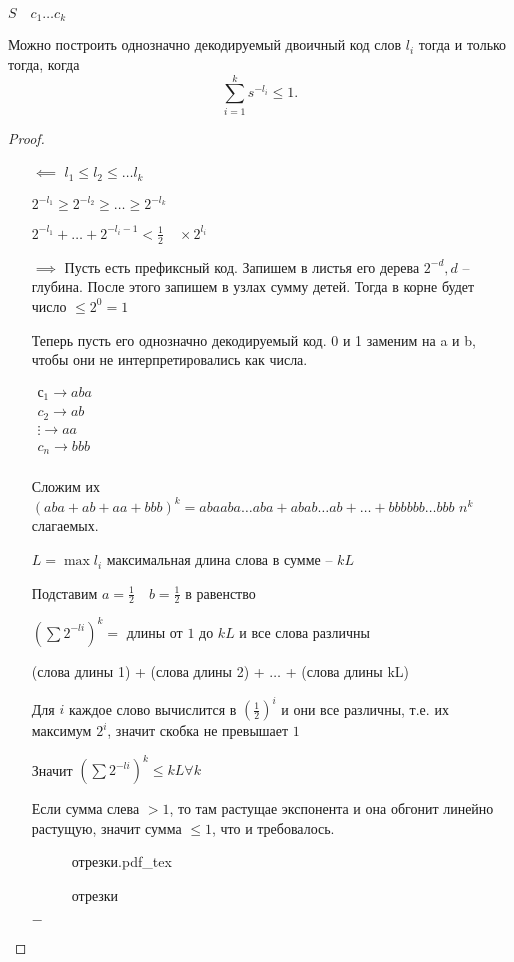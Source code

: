 \documentclass{book}
\theoremstyle{definition}
\newcommand{\incfig}[1]{%
    \def\svgwidth{\columnwidth}
    {#1.pdf_tex}
}
\begin{document}
\begin{theorem}

    $S\quad c_1\ldots c_k$

    Можно построить однозначно декодируемый двоичный код слов  $l_i$
    тогда и только тогда, когда
    \[
         \sum_{i=1}^{k} s^{-l_i} \leqslant 1
    .\] 
\end{theorem}
\begin{proof}
    \begin{itemize}
        \item []
        \item [$\impliedby $] $l_1\leqslant l_2\leqslant \ldots l_k$

            $2^{-l_1} \geqslant  2^{-l_2} \geqslant  \ldots \geqslant  2^{-l_k}$

            $2^{-l_1}+ \ldots + 2^{-l_i-1}<\frac{1}{2}\quad \times 2^{l_i}$ 
        \item [$\implies $] Пусть есть префиксный код. Запишем в листья его дерева $2^{-d}, d$ -- глубина. После этого запишем в узлах сумму детей. Тогда в корне будет  число $\leqslant 2^0=1$

            Теперь пусть его однозначно декодируемый код. 0 и 1 заменим на a и b, чтобы они не интерпретировались как числа.

            $\begin{array}{c}
                с_1\to aba\\
                c_2\to ab\\
                \vdots \to  aa\\
                c_n \to bbb\\
            \end{array}$

            Сложим их $(aba+ab+aa+bbb)^k = abaaba \ldots aba + abab\ldots ab + \ldots + bbbbbb\ldots bbb$ $n^k$ слагаемых. 

            $L = \max l_i$ максимальная длина слова в сумме --  $kL$

            Подставим  $a=\frac{1}{2}\quad b=\frac{1}{2}$ в равенство

            $(\sum 2^{-li})^k = $ длины от $1$ до  $kL$ и все слова различны

            (слова длины 1)  + (слова длины 2) + $ \ldots $ + (слова длины kL)

            Для $i$ каждое слово вычислится в  $(\frac{1}{2})^i$ и они все различны, т.е. их максимум $2^i$, значит скобка не превышает $1$

            Значит  $\left( \sum 2^{-li} \right)^k \leqslant kL \forall k$

            Если сумма слева $>1$, то там растущае экспонента и она обгонит линейно растущую, значит  сумма $\leqslant 1$, что и требовалось.
\begin{figure}[ht]
    \centering
    \incfig{отрезки}
    \caption{отрезки}
    \label{fig:отрезки}
\end{figure}


$-$
    \end{itemize}
\end{proof}
\end{document}
